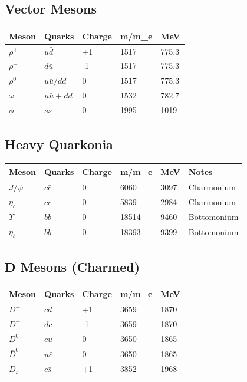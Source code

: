 \documentclass[
  11pt,
  letterpaper,
  twoside,
  openany]{book}
\makeatletter
\let\orig@subsection\subsection
\renewcommand{\subsection}{\needspace{6\baselineskip}\orig@subsection}
\makeatother
\begin{document}
\subsection{Vector Mesons}\label{vector-mesons}

\begin{longtable}[]{@{}lllll@{}}
\toprule\noalign{}
Meson & Quarks & Charge & m/m\_e & MeV \\
\midrule\noalign{}
\endhead
\bottomrule\noalign{}
\endlastfoot
\(\rho^+\) & \(u\bar{d}\) & +1 & 1517 & 775.3 \\
\(\rho^-\) & \(d\bar{u}\) & -1 & 1517 & 775.3 \\
\(\rho^0\) & \(u\bar{u}/d\bar{d}\) & 0 & 1517 & 775.3 \\
\(\omega\) & \(u\bar{u}+d\bar{d}\) & 0 & 1532 & 782.7 \\
\(\phi\) & \(s\bar{s}\) & 0 & 1995 & 1019 \\
\end{longtable}

\subsection{Heavy Quarkonia}\label{heavy-quarkonia}

\begin{longtable}[]{@{}llllll@{}}
\toprule\noalign{}
Meson & Quarks & Charge & m/m\_e & MeV & Notes \\
\midrule\noalign{}
\endhead
\bottomrule\noalign{}
\endlastfoot
\(J/\psi\) & \(c\bar{c}\) & 0 & 6060 & 3097 & Charmonium \\
\(\eta_c\) & \(c\bar{c}\) & 0 & 5839 & 2984 & Charmonium \\
\(\Upsilon\) & \(b\bar{b}\) & 0 & 18514 & 9460 & Bottomonium \\
\(\eta_b\) & \(b\bar{b}\) & 0 & 18393 & 9399 & Bottomonium \\
\end{longtable}

\subsection{D Mesons (Charmed)}\label{d-mesons-charmed}

\begin{longtable}[]{@{}lllll@{}}
\toprule\noalign{}
Meson & Quarks & Charge & m/m\_e & MeV \\
\midrule\noalign{}
\endhead
\bottomrule\noalign{}
\endlastfoot
\(D^+\) & \(c\bar{d}\) & +1 & 3659 & 1870 \\
\(D^-\) & \(d\bar{c}\) & -1 & 3659 & 1870 \\
\(D^0\) & \(c\bar{u}\) & 0 & 3650 & 1865 \\
\(\bar{D}^0\) & \(u\bar{c}\) & 0 & 3650 & 1865 \\
\(D_s^+\) & \(c\bar{s}\) & +1 & 3852 & 1968 \\
\end{longtable}
\end{document}
